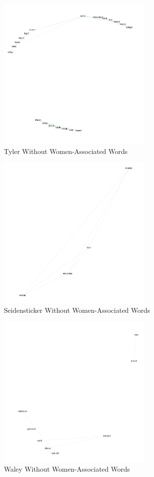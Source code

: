 \documentclass[12pt]{article}
\begin{document}
\begin{flushleft}
\begin{spacing}{2.0}
\begin{figure}
  \includegraphics[width= 3in]{tyler-no-womenwords.png}
  \caption{Tyler Without Women-Associated Words}
  \label{fig:washburn-no-womenwords}
\end{figure}

\begin{figure}
  \includegraphics[width= 3in]{seidensticker-no-womenwords.png}
  \caption{Seidensticker Without Women-Associated Words}
  \label{fig:washburn-no-womenwords}
\end{figure}


\begin{figure}
  \includegraphics[width= 3in]{waley-no-womenwords.png}
  \caption{Waley Without Women-Associated Words}
  \label{fig:washburn-no-womenwords}
\end{figure}



\end{spacing}
\end{flushleft}
\end{document}
